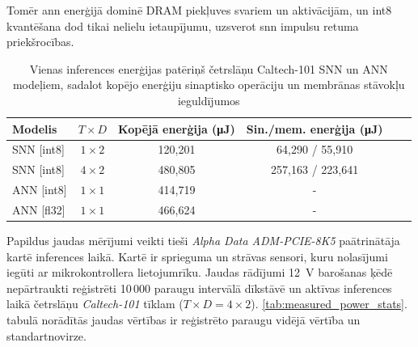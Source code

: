Tomēr \Gls{ann} enerģijā dominē DRAM piekļuves svariem un aktivācijām, un int8 kvantēšana dod tikai nelielu ietaupījumu,
uzsverot \Gls{snn} impulsu retuma priekšrocības.


\begin{table}[h!]
\centering
\caption{Vienas inferences enerģijas patēriņš četrslāņu Caltech-101 SNN un ANN modeļiem, sadalot kopējo enerģiju sinaptisko operāciju un membrānas stāvokļu ieguldījumos}
\label{tab:power_usage}
\begin{tabular}{@{}lccccc@{}}
\toprule
\textbf{Modelis} & \textbf{\(T\times D\)} & \textbf{Kopējā enerģija (\unit{\micro\joule})} & \textbf{Sin./mem. enerģija (\unit{\micro\joule})}  \\ \midrule
SNN [int8]  & \(1 \times 2\)   & 120{,}201   & 64{,}290  / 55{,}910   \\
SNN [int8]  & \(4 \times 2\)   & 480{,}805   & 257{,}163 / 223{,}641  \\
ANN [int8]  & \(1 \times 1\)   & 414{,}719   &  -  \\
ANN [fl32]  & \(1 \times 1\)   & 466{,}624   &  -  \\
\bottomrule
\end{tabular}
\end{table}

Papildus jaudas mērījumi veikti tieši \textit{Alpha Data ADM-PCIE-8K5} paātrinātāja kartē inferences laikā. Kartē ir
sprieguma un strāvas sensori, kuru nolasījumi iegūti ar mikrokontrollera lietojumrīku. Jaudas rādījumi 12~V barošanas ķēdē
nepārtraukti reģistrēti 10\,000 paraugu intervālā dīkstāvē un aktīvas inferences laikā četrslāņu \textit{Caltech-101} tīklam
($T\times D = 4\times 2$). \ref{tab:measured_power_stats}. tabulā norādītās jaudas vērtības ir reģistrēto paraugu vidējā
vērtība un standartnovirze.

